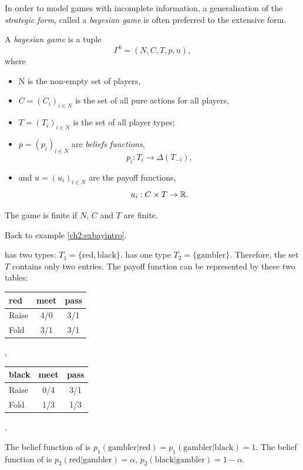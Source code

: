 In order to model games with incomplete information, a generalisation of the \emph{strategic form}, called a \emph{bayesian game} is often preferred to the extensive form.

\begin{definition}
A \emph{bayesian game} is a tuple $$\Gamma^b = (N,C,T,p,u), $$
where
\begin{itemize}
\item N is the non-empty set of players, 
\item $C = (C_i)_{i \in N}$ is the set of all pure actions for all players, 
\item $T = (T_i)_{i \in N}$ is the set of all player types; 
\item $p = (p_i)_{i \in N}$ are \emph{beliefs functions}, 
$$ p_i : T_i \rightarrow \Delta(T_{-i}),$$
\item and $u = (u_i)_{i \in N}$ are the payoff functions, 
$$ u_i : C \times T \rightarrow \mathbb{R}. $$
\end{itemize}
The game is finite if $N$, $C$ and $T$ are finite.
\end{definition}
 \begin{example}
 Back to example \ref{ch2:exbayintro}.
 
 \TAtwo{} has two types: $T_1 = \{\text{red}, \text{black}\}$. \TAone{} has one type $T_2  =\{\text{gambler}\}$. Therefore, the set $T$ contains only two entries. 
 The payoff function can be represented by these two tables:
\begin{center}
\begin{tabular}{l|cc}
red & meet & pass \\
\hline
Raise & 4/0 & 3/1 \\
Fold  & 3/1 & 3/1 \\
\end{tabular}, $\qquad$
\begin{tabular}{l|cc}
black & meet & pass \\
\hline
Raise & 0/4 & 3/1 \\
Fold  & 1/3 & 1/3 \\
\end{tabular}.
\end{center}
 
 
 The belief function of \TAtwo{} is $p_1(\text{gambler}|\text{red}) = p_1(\text{gambler}|\text{black}) = 1.$
The belief function of \TAone{} is $p_2(\text{red} | \text{gambler}) = \alpha$,  $p_2(\text{black}|\text{gambler}) = 1-\alpha$.
 \end{example}
 
